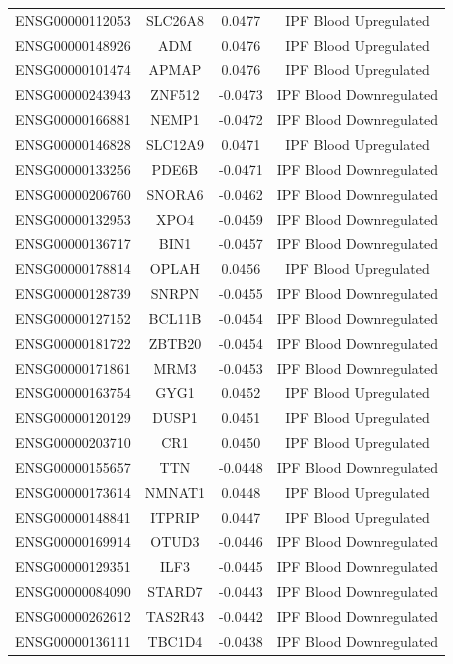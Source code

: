 \documentclass[
]{article}
\begin{document}
\begin{singlespace}
\begin{longtable}[t]{lccc}
ENSG00000112053 & SLC26A8 & 0.0477 & IPF Blood Upregulated\\
ENSG00000148926 & ADM & 0.0476 & IPF Blood Upregulated\\
\addlinespace
ENSG00000101474 & APMAP & 0.0476 & IPF Blood Upregulated\\
ENSG00000243943 & ZNF512 & -0.0473 & IPF Blood Downregulated\\
ENSG00000166881 & NEMP1 & -0.0472 & IPF Blood Downregulated\\
ENSG00000146828 & SLC12A9 & 0.0471 & IPF Blood Upregulated\\
ENSG00000133256 & PDE6B & -0.0471 & IPF Blood Downregulated\\
\addlinespace
ENSG00000206760 & SNORA6 & -0.0462 & IPF Blood Downregulated\\
ENSG00000132953 & XPO4 & -0.0459 & IPF Blood Downregulated\\
ENSG00000136717 & BIN1 & -0.0457 & IPF Blood Downregulated\\
ENSG00000178814 & OPLAH & 0.0456 & IPF Blood Upregulated\\
ENSG00000128739 & SNRPN & -0.0455 & IPF Blood Downregulated\\
\addlinespace
ENSG00000127152 & BCL11B & -0.0454 & IPF Blood Downregulated\\
ENSG00000181722 & ZBTB20 & -0.0454 & IPF Blood Downregulated\\
ENSG00000171861 & MRM3 & -0.0453 & IPF Blood Downregulated\\
ENSG00000163754 & GYG1 & 0.0452 & IPF Blood Upregulated\\
ENSG00000120129 & DUSP1 & 0.0451 & IPF Blood Upregulated\\
\addlinespace
ENSG00000203710 & CR1 & 0.0450 & IPF Blood Upregulated\\
ENSG00000155657 & TTN & -0.0448 & IPF Blood Downregulated\\
ENSG00000173614 & NMNAT1 & 0.0448 & IPF Blood Upregulated\\
ENSG00000148841 & ITPRIP & 0.0447 & IPF Blood Upregulated\\
ENSG00000169914 & OTUD3 & -0.0446 & IPF Blood Downregulated\\
\addlinespace
ENSG00000129351 & ILF3 & -0.0445 & IPF Blood Downregulated\\
ENSG00000084090 & STARD7 & -0.0443 & IPF Blood Downregulated\\
ENSG00000262612 & TAS2R43 & -0.0442 & IPF Blood Downregulated\\
ENSG00000136111 & TBC1D4 & -0.0438 & IPF Blood Downregulated\\

\end{longtable}
\end{singlespace}
\end{document}
